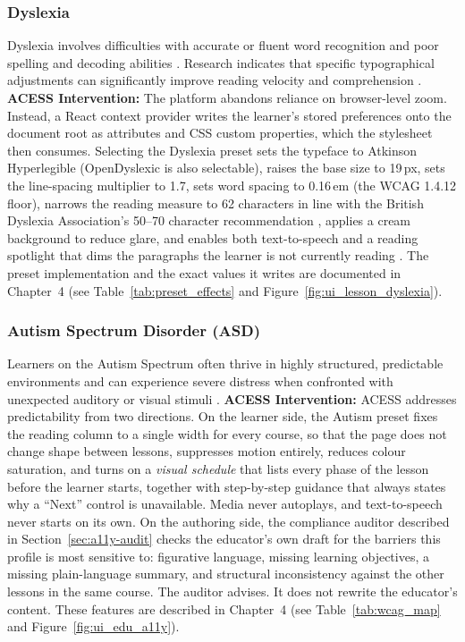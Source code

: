 \documentclass[12pt, oneside]{article} %
\newcommand{\tcode}[1]{\path{#1}}
\begin{document}
\subsubsection{Dyslexia}
Dyslexia involves difficulties with accurate or fluent word recognition and poor spelling and decoding abilities \cite{rello2013effect}. Research indicates that specific typographical adjustments can significantly improve reading velocity and comprehension \cite{franceschini_dyslexia}.
\textbf{ACESS Intervention:} The platform abandons reliance on browser-level zoom. Instead, a React context provider writes the learner's stored preferences onto the document root as \tcode{data-*} attributes and CSS custom properties, which the stylesheet then consumes. Selecting the Dyslexia preset sets the typeface to Atkinson Hyperlegible \cite{atkinson2021atkinson} (OpenDyslexic \cite{opendyslexic} is also selectable), raises the base size to 19\,px, sets the line-spacing multiplier to 1.7, sets word spacing to 0.16\,em (the WCAG 1.4.12 floor), narrows the reading measure to 62 characters in line with the British Dyslexia Association's 50--70 character recommendation \cite{bda_style_guide}, applies a cream background to reduce glare, and enables both text-to-speech and a reading spotlight that dims the paragraphs the learner is not currently reading \cite{batanero2014accessibility}. The preset implementation and the exact values it writes are documented in Chapter~4 (see Table~\ref{tab:preset_effects} and Figure~\ref{fig:ui_lesson_dyslexia}).

\subsubsection{Autism Spectrum Disorder (ASD)}
Learners on the Autism Spectrum often thrive in highly structured, predictable environments and can experience severe distress when confronted with unexpected auditory or visual stimuli \cite{lawson2011autism}.
\textbf{ACESS Intervention:} ACESS addresses predictability from two directions. On the learner side, the Autism preset fixes the reading column to a single width for every course, so that the page does not change shape between lessons, suppresses motion entirely, reduces colour saturation, and turns on a \emph{visual schedule} that lists every phase of the lesson before the learner starts, together with step-by-step guidance that always states why a ``Next'' control is unavailable. Media never autoplays, and text-to-speech never starts on its own. On the authoring side, the compliance auditor described in Section~\ref{sec:a11y-audit} checks the educator's own draft for the barriers this profile is most sensitive to: figurative language, missing learning objectives, a missing plain-language summary, and structural inconsistency against the other lessons in the same course. The auditor advises. It does not rewrite the educator's content. These features are described in Chapter~4 (see Table~\ref{tab:wcag_map} and Figure~\ref{fig:ui_edu_a11y}).
\end{document}
